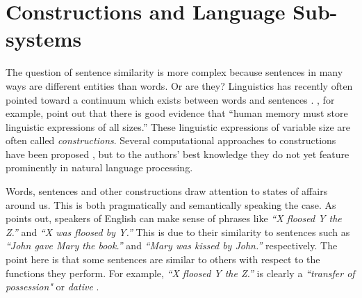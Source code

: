 \documentclass[11pt]{article}
\begin{document}
\section{Constructions and Language Sub-systems}

The question of sentence similarity is more complex because sentences in many ways are different entities than words. Or are they? Linguistics has recently often pointed toward a continuum which exists between words and sentences \cite{jackendoff2012cambridge}. , for example, point out that there is good evidence that ``human memory must store linguistic expressions of all sizes.'' These linguistic expressions of variable size are often called \emph{constructions}. Several computational approaches to constructions have been proposed \cite{Gaspers2011,chang2012computational}, but to the authors' best knowledge they do not yet feature prominently in natural language processing.

Words, sentences and other constructions draw attention to states of affairs around us. This is both pragmatically and semantically speaking the case. As  points out, speakers of English can make sense of phrases like \textit{``X floosed Y the Z.''} and \textit{``X was floosed by Y.''} This is due to their similarity to sentences such as \textit{``John gave Mary the book.''} and \textit{``Mary was kissed by John.''} respectively.  The point here is that some sentences are similar to others with respect to the functions they perform. For example, \textit{``X floosed Y the Z.''} is clearly a \emph{``transfer of possession"} or \emph{dative} \cite{bresnan2007predicting}.

\end{document}
